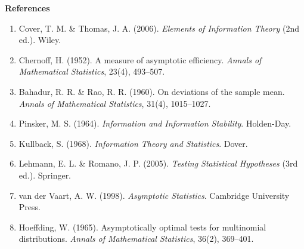 \documentclass[
  12pt,
]{ctexart}
\providecommand{\tightlist}{%
  \setlength{\itemsep}{0pt}\setlength{\parskip}{0pt}}
\begin{document}
\textbf{References}

\begin{enumerate}
\def\labelenumi{\arabic{enumi}.}
\tightlist
\item
  Cover, T. M. \& Thomas, J. A. (2006). \emph{Elements of Information
  Theory} (2nd ed.). Wiley.
\item
  Chernoff, H. (1952). A measure of asymptotic efficiency. \emph{Annals
  of Mathematical Statistics}, 23(4), 493--507.
\item
  Bahadur, R. R. \& Rao, R. R. (1960). On deviations of the sample mean.
  \emph{Annals of Mathematical Statistics}, 31(4), 1015--1027.
\item
  Pinsker, M. S. (1964). \emph{Information and Information Stability}.
  Holden-Day.
\item
  Kullback, S. (1968). \emph{Information Theory and Statistics}. Dover.
\item
  Lehmann, E. L. \& Romano, J. P. (2005). \emph{Testing Statistical
  Hypotheses} (3rd ed.). Springer.
\item
  van der Vaart, A. W. (1998). \emph{Asymptotic Statistics}. Cambridge
  University Press.
\item
  Hoeffding, W. (1965). Asymptotically optimal tests for multinomial
  distributions. \emph{Annals of Mathematical Statistics}, 36(2),
  369--401.
\end{enumerate}
\end{document}
